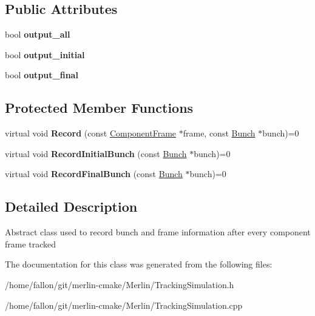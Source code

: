 \subsection*{Public Attributes}
\begin{DoxyCompactItemize}
\item 
\mbox{\label{classSimulationOutput_a0f03229340633b67d28d42f7098396d1}} 
bool {\bfseries output\+\_\+all}
\item 
\mbox{\label{classSimulationOutput_acff00305d03964266edb233159cf8abb}} 
bool {\bfseries output\+\_\+initial}
\item 
\mbox{\label{classSimulationOutput_a9a31baa599aae15a1b634b63714ff8d5}} 
bool {\bfseries output\+\_\+final}
\end{DoxyCompactItemize}
\subsection*{Protected Member Functions}
\begin{DoxyCompactItemize}
\item 
\mbox{\label{classSimulationOutput_aed52d915f027d7925259114781fa4d56}} 
virtual void {\bfseries Record} (const \hyperlink{classComponentFrame}{Component\+Frame} $\ast$frame, const \hyperlink{classBunch}{Bunch} $\ast$bunch)=0
\item 
\mbox{\label{classSimulationOutput_a0b5c06cab0be51e2d447a8ecb38c942b}} 
virtual void {\bfseries Record\+Initial\+Bunch} (const \hyperlink{classBunch}{Bunch} $\ast$bunch)=0
\item 
\mbox{\label{classSimulationOutput_a746fec81665002eed688e3119a79a3bc}} 
virtual void {\bfseries Record\+Final\+Bunch} (const \hyperlink{classBunch}{Bunch} $\ast$bunch)=0
\end{DoxyCompactItemize}


\subsection{Detailed Description}
Abstract class used to record bunch and frame information after every component frame tracked 

The documentation for this class was generated from the following files\+:\begin{DoxyCompactItemize}
\item 
/home/fallon/git/merlin-\/cmake/\+Merlin/Tracking\+Simulation.\+h\item 
/home/fallon/git/merlin-\/cmake/\+Merlin/Tracking\+Simulation.\+cpp\end{DoxyCompactItemize}
